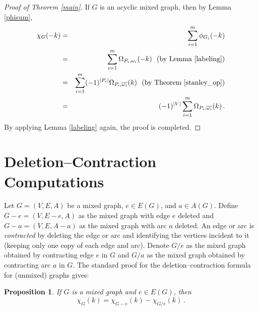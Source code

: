\documentclass[11pt]{amsart}
\newtheorem{proposition}[theorem]{Proposition}
\begin{document}
\begin{proof}[Proof of Theorem \ref{main}]
If $G$ is an acyclic mixed graph, then by Lemma \ref{phisum},
\begin{eqnarray*}
\chi_G(-k) &=& \displaystyle\sum_{i=1}^m \phi_{G_i}(-k) \\
&=& \displaystyle\sum_{i=1}^m \Omega_{P_i,\omega_i}(-k) \ \text{ (by Lemma \ref{labeling})}\\
&=& \displaystyle\sum_{i=1}^m (-1)^{|P_i|}\Omega_{P_i,\overline{\omega_i}}(k) \ \text{ (by Theorem \ref{stanley_op})}\\
&=& (-1)^{|V|}\displaystyle\sum_{i=1}^m \Omega_{P_i,\overline{\omega_i}}(k) \, . 
\end{eqnarray*}
By applying Lemma \ref{labeling} again, the proof is completed.
\end{proof}


\section{Deletion--Contraction Computations}\label{delcon}

Let $G=(V,E,A)$ be a mixed graph, $e \in E(G)$, and $a \in A(G)$. Define $G-e = (V,E-e,A)$ as the mixed graph with edge $e$ deleted and $G-a = (V,E,A-a)$ as the mixed graph with arc $a$ deleted. An edge or arc is \emph{contracted} by deleting the edge or arc and identifying the vertices incident to it (keeping only one copy of each edge and arc). Denote $G/e$ as the mixed graph obtained by contracting edge $e$ in $G$ and $G/a$ as the mixed graph obtained by contracting arc $a$ in $G$.
The standard proof for the deletion--contraction formula for (unmixed) graphs gives:

\begin{proposition}\label{DCedge} 
If $G$ is a mixed graph and $e \in E(G)$, then $$\chi_G(k) = \chi_{G-e}(k) - \chi_{G/e}(k) \, .$$
\end{proposition}

\end{document}
